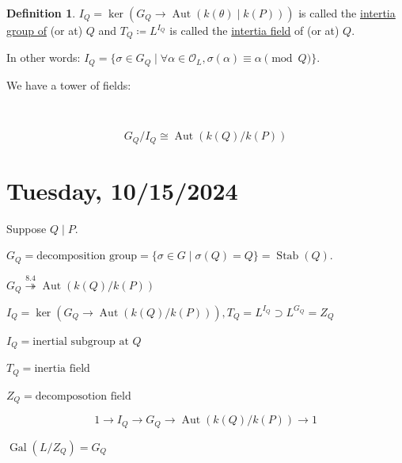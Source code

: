 \documentclass[openany]{amsbook}
\numberwithin{section}{chapter}
\theoremstyle{definition}
\newtheorem*{definition}{Definition}
\begin{document}
\begin{definition}
    \(I_Q = \ker (G_Q \to \operatorname{Aut} (k(\theta ) \mid k(P)))\) is called the \underline{intertia group of} (or at) \(Q\) and \(T_Q \coloneqq L^{I_Q}\) is called the \underline{intertia field} of (or at) \(Q\).

    In other words: \(I_Q = \{ \sigma \in G_Q \mid \forall \alpha \in \mathcal{O}_L, \sigma (\alpha) \equiv \alpha \pmod Q \} \).
\end{definition}

We have a tower of fields:

\begin{center}

    \ \

    \[
        G_Q / I_Q \cong \operatorname{Aut}(k(Q) / k(P))
    \] 

\end{center}

\section*{Tuesday, 10/15/2024}

Suppose \(Q\mid P\).

\(G_Q = \text{decomposition group} =\{ \sigma \in G \mid \sigma (Q) = Q \} = \operatorname{Stab}(Q)\).

\(G_Q \overset{8.4}{\twoheadrightarrow} \operatorname{Aut} (k(Q) / k(P))\)

\(I_Q = \ker (G_Q \to \operatorname{Aut} (k(Q) / k(P))), T_Q = L^{I_Q} \supset L^{G_Q} = Z_Q\) 

\(I_Q = \text{inertial subgroup at } Q\) 

\(T_Q = \text{inertia field}\) 

\(Z_Q = \text{decomposotion field} \) 

\[
    1 \to I_Q \to G_Q \to \operatorname{Aut} (k(Q) / k(P)) \to 1
\]

\(\operatorname{Gal} (L / Z_Q) = G_Q\) 
\end{document}
